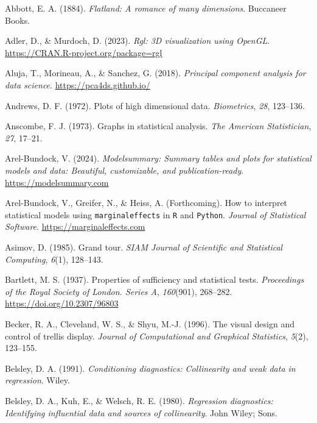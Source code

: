 \documentclass[
  letterpaper,
  10pt,
  krantz2]{krantz}
\newlength{\cslhangindent}
\newenvironment{CSLReferences}[2] %
 {\begin{list}{}{%
  \setlength{\itemindent}{0pt}
  \setlength{\leftmargin}{0pt}
  \setlength{\parsep}{0pt}
  \ifodd #1
   \setlength{\leftmargin}{\cslhangindent}
   \setlength{\itemindent}{-1\cslhangindent}
  \fi
  \setlength{\itemsep}{#2\baselineskip}}}
 {\end{list}}
\begin{document}
\label{refs}
\begin{CSLReferences}{1}{0}
Abbott, E. A. (1884). \emph{Flatland: A romance of many dimensions}.
Buccaneer Books.

Adler, D., \& Murdoch, D. (2023). \emph{Rgl: 3D visualization using
OpenGL}. \url{https://CRAN.R-project.org/package=rgl}

Aluja, T., Morineau, A., \& Sanchez, G. (2018). \emph{Principal
component analysis for data science}. \url{https://pca4ds.github.io/}

Andrews, D. F. (1972). Plots of high dimensional data.
\emph{Biometrics}, \emph{28}, 123--136.

Anscombe, F. J. (1973). Graphs in statistical analysis. \emph{The
American Statistician}, \emph{27}, 17--21.

Arel-Bundock, V. (2024). \emph{Modelsummary: Summary tables and plots
for statistical models and data: Beautiful, customizable, and
publication-ready}. \url{https://modelsummary.com}

Arel-Bundock, V., Greifer, N., \& Heiss, A. (Forthcoming). How to
interpret statistical models using \texttt{marginaleffects} in
\texttt{R} and \texttt{Python}. \emph{Journal of Statistical Software}.
\url{https://marginaleffects.com}

Asimov, D. (1985). Grand tour. \emph{SIAM Journal of Scientific and
Statistical Computing}, \emph{6}(1), 128--143.

Bartlett, M. S. (1937). Properties of sufficiency and statistical tests.
\emph{Proceedings of the Royal Society of London. Series A},
\emph{160}(901), 268--282. \url{https://doi.org/10.2307/96803}

Becker, R. A., Cleveland, W. S., \& Shyu, M.-J. (1996). The visual
design and control of trellis display. \emph{Journal of Computational
and Graphical Statistics}, \emph{5}(2), 123--155.

Belsley, D. A. (1991). \emph{Conditioning diagnostics: Collinearity and
weak data in regression}. Wiley.

Belsley, D. A., Kuh, E., \& Welsch, R. E. (1980). \emph{Regression
diagnostics: Identifying influential data and sources of collinearity}.
John Wiley; Sons.


\end{CSLReferences}
\end{document}
